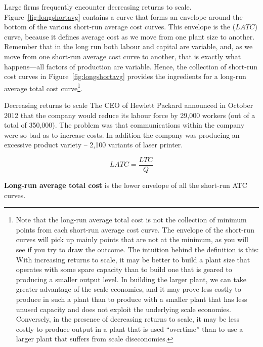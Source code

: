 Large firms frequently encounter decreasing returns to scale. Figure~\ref{fig:longshortavg} contains a curve that forms an envelope around the bottom of the various short-run average cost curves. This envelope is the  ($LATC$) curve, because it defines average cost as we move from one plant size to another. Remember that in the long run both labour and capital are variable, and, as we move from one short-run average cost curve to another, that is exactly what happens---all factors of production are variable. Hence, the collection of short-run cost curves in Figure~\ref{fig:longshortavg} provides the ingredients for a long-run average total cost curve\footnote{Note that the long-run average total cost is not the collection of minimum points from each short-run average cost curve. The envelope of the short-run curves will pick up mainly points that are not at the minimum, as you will see if you try to draw the outcome. The intuition behind the definition is this: With increasing returns to scale, it may be better to build a plant size that operates with some spare capacity than to build one that is geared to producing a smaller output level. In building the larger plant, we can take greater advantage of the scale economies, and it may prove less costly to produce in such a plant than to produce with a smaller plant that has less unused capacity and does not exploit the underlying scale economies. Conversely, in the presence of decreasing returns to scale, it may be less costly to produce output in a plant that is used ``overtime'' than to use a larger plant that suffers from scale diseconomies.}. 

\begin{ApplicationBox}{Decreasing returns to scale \label{app:decretscale}}
The CEO of Hewlett Packard announced in October 2012 that the company would reduce its labour force by 29,000 workers (out of a total of 350,000). The problem was that communications within the company were so bad as to increase costs. In addition the company was producing an excessive product variety -- 2,100 variants of laser printer.
\end{ApplicationBox}

\begin{equation*}
LATC=\frac{LTC}{Q}
\end{equation*}

\begin{DefBox}
\textbf{Long-run average total cost} is the lower envelope of all the short-run ATC curves.
\end{DefBox}


